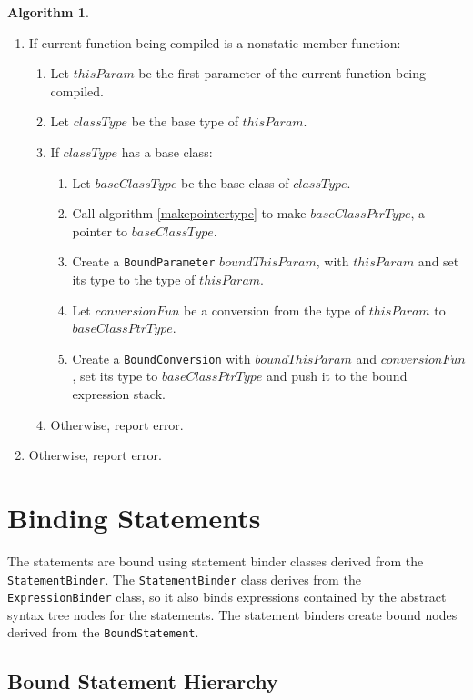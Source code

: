 \documentclass[a4paper,oneside,11pt]{book}
\theoremstyle{definition}
\newtheorem{algo}{Algorithm}[section]
\begin{document}
\begin{algo}
\begin{itemize}
\begin{enumerate}
\item
If current function being compiled is a nonstatic member function:
\begin{enumerate}
\item
Let $thisParam$ be the first parameter of the current function being compiled.
\item
Let $classType$ be the base type of $thisParam$.
\item
If $classType$ has a base class:
\begin{enumerate}
\item
Let $baseClassType$ be the base class of $classType$.
\item
Call algorithm \ref{makepointertype} to make $baseClassPtrType$,  a pointer to $baseClassType$.
\item
Create a \verb|BoundParameter| $boundThisParam$, with $thisParam$ and set its type to the type of $thisParam$.
\item
Let $conversionFun$ be a conversion from the type of $thisParam$ to $baseClassPtrType$.
\item
Create a \verb|BoundConversion| with $boundThisParam$ and $conversionFun$, set its type to $baseClassPtrType$ and push it to the bound expression stack.
\end{enumerate}
\item
Otherwise, report error.
\end{enumerate}
\item
Otherwise, report error.
\end{enumerate}
\end{itemize}
\end{algo}

\chapter{Binding Statements}

The statements are bound using statement binder classes derived from the \verb|StatementBinder|.
The \verb|StatementBinder| class derives from the \verb|ExpressionBinder| class,
so it also binds expressions contained by the abstract syntax tree nodes for the statements.
The statement binders create bound nodes derived from the \verb|BoundStatement|.

\section{Bound Statement Hierarchy}
\end{document}
